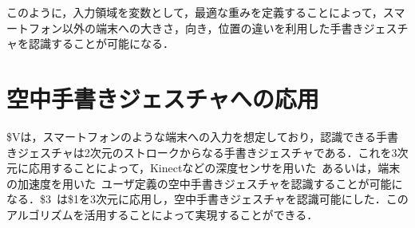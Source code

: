 このように，入力領域を変数として，最適な重みを定義することによって，スマートフォン以外の端末への大きさ，向き，位置の違いを利用した手書きジェスチャを認識することが可能になる．

\section{空中手書きジェスチャへの応用}
\$Vは，スマートフォンのような端末への入力を想定しており，認識できる手書きジェスチャは2次元のストロークからなる手書きジェスチャである．これを3次元に応用することによって，Kinectなどの深度センサを用いた~\cite{Tian_kinwrite:handwriting-based}あるいは，端末の加速度を用いた~\cite{Ruiz:2011:UMG:1978942.1978971}ユーザ定義の空中手書きジェスチャを認識することが可能になる．\$3~\cite{}は\$1を3次元に応用し，空中手書きジェスチャを認識可能にした．このアルゴリズムを活用することによって実現することができる．


